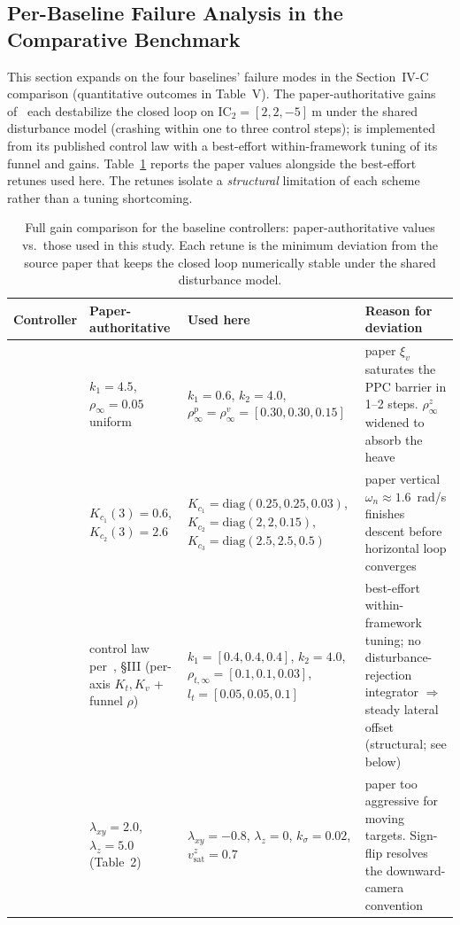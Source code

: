 \documentclass[10pt,journal]{IEEEtran}
\begin{document}
\subsection{Per-Baseline Failure Analysis in the Comparative Benchmark}
\label{sec:sup-comparison}

This section expands on the four baselines' failure modes in the Section~IV-C comparison (quantitative outcomes in Table~V). The paper-authoritative gains of~\cite{lin2022,zhang2026,cho2022} each destabilize the closed loop on IC$_2=[2,2,-5]~\text{m}$ under the shared disturbance model (crashing within one to three control steps); \cite{lin2023} is implemented from its published control law with a best-effort within-framework tuning of its funnel and gains. Table~\ref{baseline gains: table} reports the paper values alongside the best-effort retunes used here. The retunes isolate a \emph{structural} limitation of each scheme rather than a tuning shortcoming.

\begin{table}[!t]
\centering
\footnotesize
\caption{Full gain comparison for the baseline controllers: paper-authoritative values vs.\ those used in this study. Each retune is the minimum deviation from the source paper that keeps the closed loop numerically stable under the shared disturbance model.}
\label{baseline gains: table}
\begin{tabular}{p{} p{} p{} p{}}
\toprule
\textbf{Controller} & \textbf{Paper-authoritative} & \textbf{Used here} & \textbf{Reason for deviation} \\
\midrule
\cite{lin2022} & $k_1{=}4.5$, $\rho_\infty{=}0.05$ uniform & $k_1{=}0.6$, $k_2{=}4.0$, $\rho_\infty^p{=}\rho_\infty^v{=}[0.30,0.30,0.15]$ & paper $\xi_v$ saturates the PPC barrier in 1--2 steps. $\rho_\infty^z$ widened to absorb the~\cite{lin2022} heave \\
\cite{zhang2026} & $K_{c_1}(3){=}0.6$, $K_{c_2}(3){=}2.6$ & $K_{c_1}{=}\text{diag}(0.25,0.25,0.03)$, $K_{c_2}{=}\text{diag}(2,2,0.15)$, $K_{c_3}{=}\text{diag}(2.5,2.5,0.5)$ & paper vertical $\omega_n{\approx}1.6$~rad/s finishes descent before horizontal loop converges \\
\cite{lin2023} & control law per~\cite{lin2023}, \S III (per-axis $K_t,K_v$ + funnel $\rho$) & $k_1{=}[0.4,0.4,0.4]$, $k_2{=}4.0$, $\rho_{t,\infty}{=}[0.1,0.1,0.03]$, $l_t{=}[0.05,0.05,0.1]$ & best-effort within-framework tuning; no disturbance-rejection integrator $\Rightarrow$ steady lateral offset (structural; see below) \\
\cite{cho2022} & $\lambda_{xy}{=}2.0$, $\lambda_z{=}5.0$ (Table~2) & $\lambda_{xy}{=}{-}0.8$, $\lambda_z{=}0$, $k_\sigma{=}0.02$, $v_\text{sat}^z{=}0.7$ & paper too aggressive for moving targets. Sign-flip resolves the downward-camera convention \\
\bottomrule
\end{tabular}
\end{table}
\end{document}
